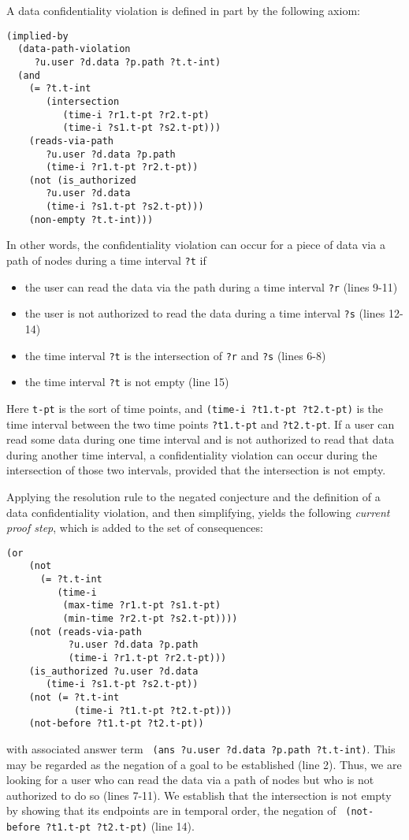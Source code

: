 A data confidentiality violation is defined in part by the following axiom:   
\begin{lstlisting}[]                                               
(implied-by
  (data-path-violation 
     ?u.user ?d.data ?p.path ?t.t-int)
  (and
    (= ?t.t-int
       (intersection
    	  (time-i ?r1.t-pt ?r2.t-pt)
    	  (time-i ?s1.t-pt ?s2.t-pt)))
    (reads-via-path
       ?u.user ?d.data ?p.path 
       (time-i ?r1.t-pt ?r2.t-pt))
    (not (is_authorized
       ?u.user ?d.data
       (time-i ?s1.t-pt ?s2.t-pt)))
    (non-empty ?t.t-int)))
\end{lstlisting}

In other words, the confidentiality violation can occur for a piece of data via a path of nodes during a time interval \verb'?t' if
\begin{itemize}
\item the user can read the data via the path during a time interval \verb'?r' (lines 9-11)
\item the user is not authorized to read the data during a time interval \verb'?s' (lines 12-14)
\item the time interval \verb'?t' is the intersection of \verb'?r' and \verb'?s' (lines 6-8)
\item the time interval \verb'?t' is not empty (line 15)
\end{itemize}

Here  \verb't-pt' is the sort of time points, and \verb'(time-i ?t1.t-pt ?t2.t-pt)' is the time interval between the two time points \verb'?t1.t-pt' and \verb'?t2.t-pt'. If a user can read some data during one time interval and is not authorized to read that data during another time interval, a confidentiality violation can occur during the intersection of those two intervals, provided that the intersection is not empty.

Applying the resolution rule to the negated conjecture and the definition of a data confidentiality violation, and then simplifying, yields the following \textit{current proof step}, which is added to the set of consequences:

\begin{lstlisting}[] 
   (or 
    (not 
      (= ?t.t-int
         (time-i 
          (max-time ?r1.t-pt ?s1.t-pt)
          (min-time ?r2.t-pt ?s2.t-pt))))
    (not (reads-via-path
           ?u.user ?d.data ?p.path
           (time-i ?r1.t-pt ?r2.t-pt)))
    (is_authorized ?u.user ?d.data
       (time-i ?s1.t-pt ?s2.t-pt))
    (not (= ?t.t-int
            (time-i ?t1.t-pt ?t2.t-pt)))
    (not-before ?t1.t-pt ?t2.t-pt))
\end{lstlisting}
with associated answer term \verb' (ans ?u.user ?d.data ?p.path ?t.t-int)'.
This may be regarded as the negation of a goal to be established (line 2).
Thus, we are looking for a user who can read the data via a path of nodes but who is not authorized to do so (lines 7-11).
We establish that the intersection is not empty by showing that its endpoints are in temporal order, \ie the negation of \verb' (not-before ?t1.t-pt ?t2.t-pt)' (line 14).

